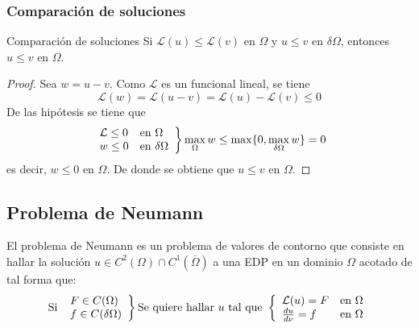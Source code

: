 \subsubsection{Comparación de soluciones}
\begin{prop}{Comparación de soluciones}
Si $\mathcal{L}(u) \le \mathcal{L}(v)$ en $\Omega$ y $u\le v$ en $\delta\Omega$, entonces $u\le v$ en $\Omega$.
\end{prop}
\begin{proof}
Sea $w = u-v$. 
Como $\mathcal{L}$ es un funcional lineal, se tiene
$$\mathcal{L}(w) = \mathcal{L}(u-v) = \mathcal{L}(u)-\mathcal{L}(v) \le 0$$
De las hipótesis se tiene que
\begin{equation*}
\left.
\begin{array}{l l}
\mathcal{L} \le 0 & \text{en } \Omega\\
w \le 0 & \text{en } \delta\Omega\\
\end{array}
\right\}
\max_{\Omega}w\le\max\{0,\max_{\delta\Omega}w\} = 0
\end{equation*}
es decir, $w \le 0$ en $\Omega$. De donde se obtiene que $u\le v$ en $\Omega$.
\end{proof}


\subsection{Problema de Neumann}
El problema de Neumann es un problema de valores de contorno que consiste en hallar la solución $u \in C^2(\Omega)\cap C^1(\overline{\Omega})$ a una EDP en un dominio $\Omega$ acotado de tal forma que:
\begin{equation*}
\text{Si }
\left.
\begin{array}{l}
F\in C(\Omega)\\
f\in C(\delta\Omega)
\end{array}
\right\}
\text{Se quiere hallar } u\text{ tal que }
\left\{
\begin{array}{l r}
\mathcal{L}(u) = F &\text{en } \Omega\\
\frac{du}{d\nu} = f &\text{en } \Omega\\
\end{array}
\right.
\end{equation*}

